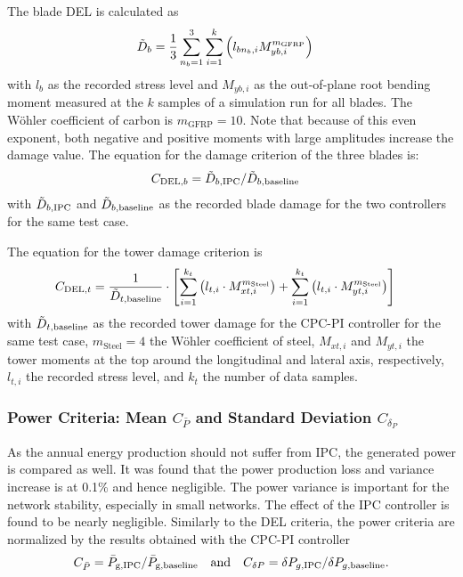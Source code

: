 The blade DEL is calculated as
\begin{align*}
    \Tilde{D}_{b} &=   \frac{1}{3}  \sum_{n_b=1}^3\sum_{i=1}^{k}\left(l_{bn_b,i}  M_{yb,i}^{m_{\text{GFRP}}}\right)
\end{align*}
with $l_{b}$ as the recorded stress level and $M_{yb,i}$ as the out-of-plane root bending moment measured at the $k$ samples of a simulation run for all blades.  The Wöhler coefficient of carbon is $m_{\text{GFRP}} =10$. Note that because of this even exponent, both negative and positive moments with large amplitudes increase the damage value.
The equation for the damage criterion of the three blades is:
\begin{align*}
    C_{\text{DEL},b} &=  \Tilde{D}_{b,\text{IPC}}/\Tilde{D}_{b,\text{baseline}}  %
\end{align*}
%
with  $\Tilde{D}_{b,\text{IPC}}$ and $\Tilde{D}_{b,\text{baseline}}$ as the recorded blade damage for the two controllers for the same test case. 

The equation for the tower damage criterion is
\begin{align*}
    C_{\text{DEL},t} &= \frac{1}{\Tilde{D}_{t,\text{baseline}}} \cdot
    \left[ \sum_{i=1}^{k_{t}} \left( l_{t,i} \cdot M_{xt,i}^{m_{\text{Steel}}} \right) + 
    \sum_{i=1}^{k_{t}} \left( l_{t,i} \cdot M_{yt,i}^{m_{\text{Steel}}} \right) \right]
\end{align*}
with $\Tilde{D}_{t,\text{baseline}}$ as the recorded tower damage for the CPC-PI controller for the same test case, $m_{\text{Steel}} =4$ the Wöhler coefficient of steel, $M_{xt,i}$ and $M_{yt,i}$ the tower moments at the top around the longitudinal and lateral axis, respectively,  $l_{t,i}$ the recorded stress level, and $k_t$ the number of data samples.

\subsubsection*{Power Criteria: Mean $C_{\bar{P}}$ and Standard Deviation $C_{\delta_P}$}
As the annual energy production should not suffer from IPC, the generated power is compared as well. It was found that the power production loss and variance increase is at 0.1\% and hence negligible. The power variance is important for the network stability, especially in small networks. The effect of the IPC controller is found to be nearly negligible. Similarly to the DEL criteria, the power criteria are normalized by the results obtained with the CPC-PI controller
\begin{align*} %
    C_{\bar{P}} =  \bar{P}_{\text{g,\text{IPC}}}/ \bar{P}_{\text{g,\text{baseline}}}  \quad\text{and}\quad C_{\delta P} =  \delta P_{g,\text{IPC}}/ \delta P_{g,\text{baseline}}.
\end{align*} 

